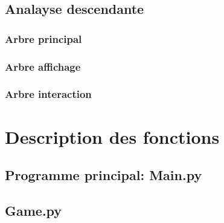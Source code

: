 \documentclass[a4paper]{article}
\begin{document}
        \subsection{Analayse descendante}
            \subsubsection{Arbre principal}
            \begin{alltt}
            
            \end{alltt}
            \subsubsection{Arbre affichage}
            \begin{alltt}
            
            \end{alltt}
            \subsubsection{Arbre interaction}
            \begin{alltt}
            
            \end{alltt}
    \section{Description des fonctions}
        \subsection{Programme principal: Main.py}
            \begin{alltt}
            
               
            \end{alltt}

        \subsection{Game.py}
            \begin{alltt}
                
            \end{alltt}
\end{document}
